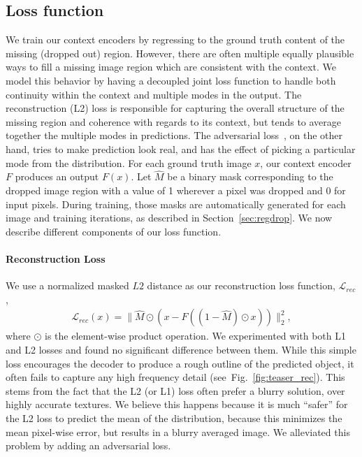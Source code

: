 \documentclass[10pt,twocolumn,letterpaper]{article}
\newcommand{\shortreffig}[1]{Fig.~\ref{fig:#1}}
\newcommand{\refsec}[1]{Section~\ref{sec:#1}}
\newcommand{\lbleq}[1]{\label{eq:#1}}
\begin{document}
\subsection{Loss function}
\label{sec:loss}
We train our context encoders by regressing to the ground truth content of the missing (dropped out) region.
However, there are often multiple equally plausible ways to fill a missing image region which are consistent with the context.
We model this behavior by having a decoupled joint loss function to handle both continuity within the context and multiple modes in the output.
The reconstruction (L2) loss is responsible for capturing the overall structure of the missing region and coherence with regards to its context, but tends to average together the multiple modes in predictions.
The adversarial loss~\cite{goodfellow2014generative}, on the other hand,  tries to make prediction look real, and has the effect of picking a particular mode from the distribution.
For each ground truth image $x$, our context encoder $F$ produces an output $F(x)$.
Let $\hat{M}$ be a binary mask corresponding to the dropped image region with a value of 1 wherever a pixel was dropped and 0 for input pixels.
During training, those masks are automatically generated for each image and training iterations, as described in \refsec{regdrop}.
We now describe different components of our loss function.

\paragraph{Reconstruction Loss}
We use a normalized masked $L2$ distance as our reconstruction loss function, $\mathcal{L}_{rec}$,
\begin{align}
\mathcal{L}_{rec}(x) = \|\hat{M}\odot(x-F((1-\hat{M})\odot x))\|_2^2 \lbleq{loss_rec},
\end{align}
where $\odot$ is the element-wise product operation.
We experimented with both L1 and L2 losses and found no significant difference between them.
While this simple loss encourages the decoder to produce a rough outline of the predicted object, it often fails to capture any high frequency detail (see~\shortreffig{teaser_rec}).
This stems from the fact that the L2 (or L1) loss often prefer a blurry  solution, over highly accurate textures.
We believe this happens because it is much ``safer'' for the L2 loss to predict the mean of the distribution, because this minimizes the mean pixel-wise error, but results in a blurry averaged image.
We alleviated this problem by adding an adversarial loss.
\end{document}
